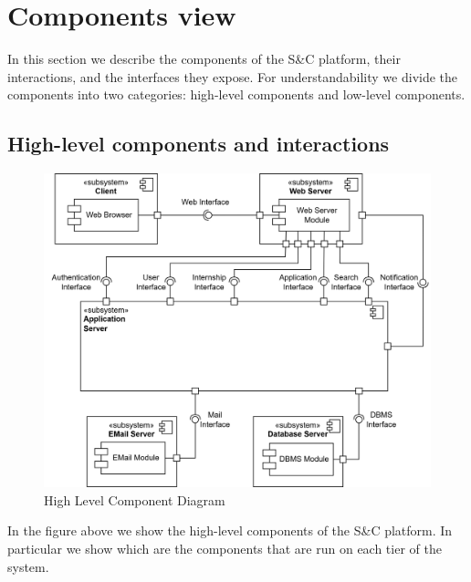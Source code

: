 \section{Components view}\label{sec:components view}
In this section we describe the components of the S\&C platform, their interactions, and the interfaces they expose. For understandability we divide the
components into two categories: high-level components and low-level components.

\subsection{High-level components and interactions}\label{subsec:high-level components and interactions}
\begin{figure}[H]
    \centering
    \includegraphics[width=1\textwidth]{Images/Components/HL_Component_Diagram.png}
    \caption{High Level Component Diagram}\label{fig:hl_component_diagram}
\end{figure}
In the figure above we show the high-level components of the S\&C platform. In particular we show which are the components that are run on each tier of 
the system.
